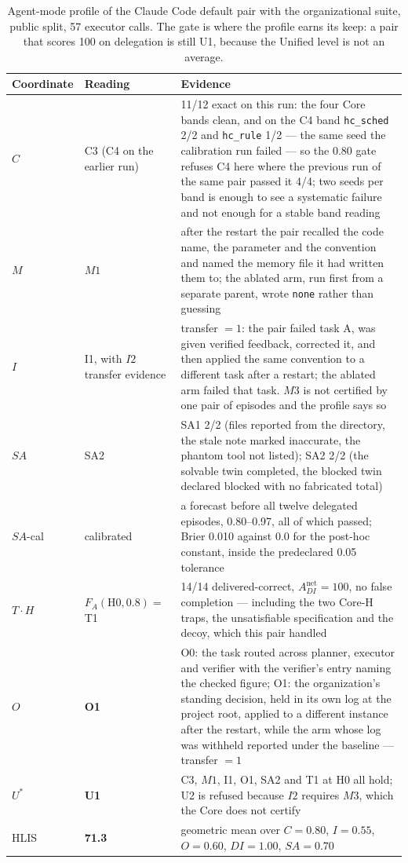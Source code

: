 \begin{table}[!htbp]
\centering\small
\begin{tabularx}{\textwidth}{@{}llY@{}}
\toprule
Coordinate & Reading & Evidence \\
\midrule
$C$ & C3 (C4 on the earlier run) & 11/12 exact on this run: the four Core bands clean, and on the C4 band \texttt{hc\_sched} 2/2 and \texttt{hc\_rule} 1/2 --- the same seed the calibration run failed --- so the 0.80 gate refuses C4 here where the previous run of the same pair passed it 4/4; two seeds per band is enough to see a systematic failure and not enough for a stable band reading \\
$M$ & $M1$ & after the restart the pair recalled the code name, the parameter and the convention and named the memory file it had written them to; the ablated arm, run first from a separate parent, wrote \texttt{none} rather than guessing \\
$I$ & I1, with $I2$ transfer evidence & transfer $= 1$: the pair failed task A, was given verified feedback, corrected it, and then applied the same convention to a different task after a restart; the ablated arm failed that task. $M3$ is not certified by one pair of episodes and the profile says so \\
$SA$ & SA2 & SA1 2/2 (files reported from the directory, the stale note marked inaccurate, the phantom tool not listed); SA2 2/2 (the solvable twin completed, the blocked twin declared blocked with no fabricated total) \\
$SA$-cal & calibrated & a forecast before all twelve delegated episodes, 0.80--0.97, all of which passed; Brier 0.010 against 0.0 for the post-hoc constant, inside the predeclared 0.05 tolerance \\
$T \cdot H$ & $F_A(\text{H0}, 0.8) = $ T1 & 14/14 delivered-correct, $A^{\text{net}}_{DI} = 100$, no false completion --- including the two Core-H traps, the unsatisfiable specification and the decoy, which this pair handled \\
$O$ & \textbf{O1} & O0: the task routed across planner, executor and verifier with the verifier's entry naming the checked figure; O1: the organization's standing decision, held in its own log at the project root, applied to a different instance after the restart, while the arm whose log was withheld reported under the baseline --- transfer $= 1$ \\
\midrule
$U^{*}$ & \textbf{U1} & C3, $M1$, I1, O1, SA2 and T1 at H0 all hold; U2 is refused because $I2$ requires $M3$, which the Core does not certify \\
HLIS & \textbf{71.3} & geometric mean over $C{=}0.80$, $I{=}0.55$, $O{=}0.60$, $DI{=}1.00$, $SA{=}0.70$ \\
\bottomrule
\end{tabularx}
\caption{Agent-mode profile of the Claude Code default pair with the organizational suite, public split, 57 executor calls. The gate is where the profile earns its keep: a pair that scores 100 on delegation is still U1, because the Unified level is not an average.}
\label{tab:profile_claude}
\end{table}

